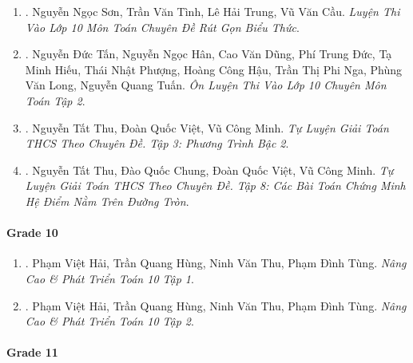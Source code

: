 \documentclass{article}
\begin{document}
\begin{enumerate}
	\item \cite{Son_Tinh_Trung_Cau_rgbt}. Nguyễn Ngọc Sơn, Trần Văn Tình, Lê Hải Trung, Vũ Văn Cầu. {\it Luyện Thi Vào Lớp 10 Môn Toán Chuyên Đề Rút Gọn Biểu Thức}.\hfill{\sf[reading]}

	\item \cite{Tan_Han_Dung_Duc_Hieu_Phuong_Hau_Nga_Long_Tuan_tap_2}. Nguyễn Đức Tấn, Nguyễn Ngọc Hân, Cao Văn Dũng, Phí Trung Đức, Tạ Minh Hiếu, Thái Nhật Phượng, Hoàng Công Hậu, Trần Thị Phi Nga, Phùng Văn Long, Nguyễn Quang Tuấn. {\it Ôn Luyện Thi Vào Lớp 10 Chuyên Môn Toán Tập 2}.

	\item \cite{Thu_Viet_Minh_ptb2}. Nguyễn Tất Thu, Đoàn Quốc Việt, Vũ Công Minh. {\it Tự Luyện Giải Toán THCS Theo Chuyên Đề. Tập 3: Phương Trình Bậc 2}.\hfill{\sf[done]}

	\item \cite{Thu_Chung_Viet_Minh_circ}. Nguyễn Tất Thu, Đào Quốc Chung, Đoàn Quốc Việt, Vũ Công Minh. {\it Tự Luyện Giải Toán THCS Theo Chuyên Đề. Tập 8: Các Bài Toán Chứng Minh Hệ Điểm Nằm Trên Đường Tròn}.\hfill{\sf[done]}
\end{enumerate}

\paragraph{Grade 10}

\begin{enumerate}
	\item \cite{Hai_Hung_Thu_Tung_ncpt_Toan_10_tap_1}. Phạm Việt Hải, Trần Quang Hùng, Ninh Văn Thu, Phạm Đình Tùng. {\it Nâng Cao \& Phát Triển Toán 10 Tập 1}.

	\item \cite{Hai_Hung_Thu_Tung_ncpt_Toan_10_tap_2}. Phạm Việt Hải, Trần Quang Hùng, Ninh Văn Thu, Phạm Đình Tùng. {\it Nâng Cao \& Phát Triển Toán 10 Tập 2}.
\end{enumerate}

\paragraph{Grade 11}
\end{document}
